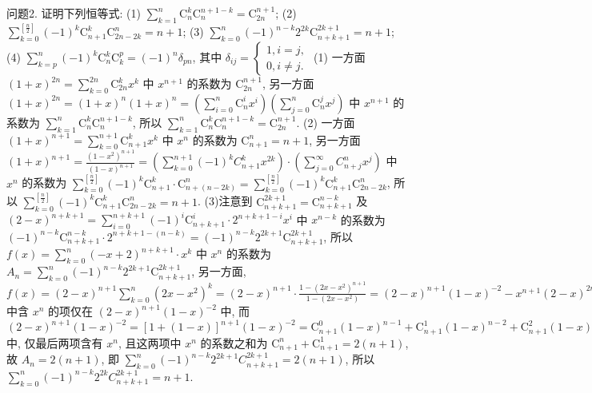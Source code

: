 问题2. 证明下列恒等式:
(1) $\sum_{k=1}^n \mathrm{C}_n^k \mathrm{C}_n^{n+1-k}=\mathrm{C}_{2 n}^{n+1}$;
(2) $\sum_{k=0}^{\left[\frac{n}{2}\right]}(-1)^k \mathrm{C}_{n+1}^k \mathrm{C}_{2 n-2 k}^n=n+1$;
(3) $\sum_{k=0}^n(-1)^{n-k} 2^{2 k} \mathrm{C}_{n+k+1}^{2 k+1}=n+1$;
(4) $\sum_{k=p}^n(-1)^k \mathrm{C}_n^k \mathrm{C}_k^p=(-1)^n \delta_{p n}$, 其中 $\delta_{i j}=\left\{\begin{array}{l}1, i=j, \\ 0, i \neq j .\end{array}\right.$
(1) 一方面 $(1+x)^{2 n}=\sum_{k=0}^{2 n} \mathrm{C}_{2 n}^k x^k$ 中 $x^{n+1}$ 的系数为 $\mathrm{C}_{2 n}^{n+1}$, 另一方面 $(1+x)^{2 n}=(1+x)^n(1+x)^n=\left(\sum_{i=0}^n \mathrm{C}_n^i x^i\right)\left(\sum_{j=0}^n \mathrm{C}_n^j x^j\right)$ 中 $x^{n+1}$ 的系数为 $\sum_{k=1}^n \mathrm{C}_n^k \mathrm{C}_n^{n+1-k}$, 所以 $\sum_{k=1}^n \mathrm{C}_n^k \mathrm{C}_n^{n+1-k}=\mathrm{C}_{2 n}^{n+1}$.
(2) 一方面 $(1+x)^{n+1}=\sum_{k=0}^{n+1} \mathrm{C}_{n+1}^k x^k$ 中 $x^n$ 的系数为 $\mathrm{C}_{n+1}^n=n+1$, 另一方面 $(1+x)^{n+1}=\frac{\left(1-x^2\right)^{n+1}}{(1-x)^{n+1}}=\left(\sum_{k=0}^{n+1}(-1)^k C_{n+1}^k x^{2 k}\right) \cdot\left(\sum_{j=0}^{\infty} C_{n+j}^n x^j\right)$ 中 $x^n$ 的系数为 $\sum_{k=0}^{\left[\frac{n}{2}\right]}(-1)^k \mathrm{C}_{n+1}^k \cdot \mathrm{C}_{n+(n-2 k)}^n=\sum_{k=0}^{\left[\frac{n}{2}\right]}(-1)^k \mathrm{C}_{n+1}^k \mathrm{C}_{2 n-2 k}^n$, 所以 $\sum_{k=0}^{\left[\frac{n}{2}\right]}(-1)^k \mathrm{C}_{n+1}^k \mathrm{C}_{2 n-2 k}^n=n+1$.
(3)注意到 $\mathrm{C}_{n+k+1}^{2 k+1}=\mathrm{C}_{n+k+1}^{n-k}$ 及 $(2-x)^{n+k+1}=\sum_{i=0}^{n+k+1}(-1)^i \mathrm{C}_{n+k+1}^i \cdot 2^{n+k+1-i} x^i$ 中 $x^{n-k}$ 的系数为 $(-1)^{n-k} \mathrm{C}_{n+k+1}^{n-k} \cdot 2^{n+k+1-(n-k)}=(-1)^{n-k} 2^{2 k+1} \mathrm{C}_{n+k+1}^{2 k+1}$, 所以 $f(x)= \sum_{k=0}^n(-x+2)^{n+k+1} \cdot x^k$ 中 $x^n$ 的系数为 $A_n=\sum_{k=0}^n(-1)^{n-k} 2^{2 k+1} \mathrm{C}_{n+k+1}^{2 k+1}$, 另一方面, $f(x)=(2-x)^{n+1} \sum_{k=0}^n\left(2 x-x^2\right)^k=(2-x)^{n+1} \cdot \frac{1-\left(2 x-x^2\right)^{n+1}}{1-\left(2 x-x^2\right)}=(2- x)^{n+1}(1-x)^{-2}-x^{n+1}(2-x)^{2 n+2}(1-x)^{-2}$ 中含 $x^n$ 的项仅在 $(2-x)^{n+1}(1-x)^{-2}$ 中, 而 $(2-x)^{n+1}(1-x)^{-2}=[1+(1-x)]^{n+1}(1-x)^{-2}=\mathrm{C}_{n+1}^0(1-x)^{n-1}+ \mathrm{C}_{n+1}^1(1-x)^{n-2}+\mathrm{C}_{n+1}^2(1-x)^{n-3}+\cdots+\mathrm{C}_{n+1}^n(1-x)^{-1}+(1-x)^{-2}$ 中, 仅最后两项含有 $x^n$, 且这两项中 $x^n$ 的系数之和为 $\mathrm{C}_{n+1}^n+\mathrm{C}_{n+1}^1=2(n+1)$, 故 $A_n=2(n+1)$, 即 $\sum_{k=0}^n(-1)^{n-k} 2^{2 k+1} C_{n+k+1}^{2 k+1}=2(n+1)$, 所以 $\sum_{k=0}^n(-1)^{n-k} 2^{2 k} C_{n+k+1}^{2 k+1}=n+1$.

